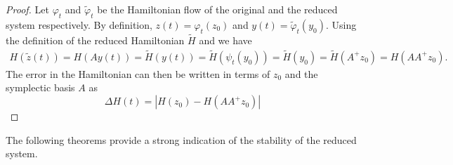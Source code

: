 \begin{proof}
	Let $\varphi_t$ and $\tilde \varphi_t$ be the Hamiltonian flow of the original and the reduced system respectively. By definition, $ z(t) = \varphi_t(z_0)$ and $ y(t) = \tilde \varphi_t(y_0)$. Using the definition of the reduced Hamiltonian $\tilde H$ and  we have
\begin{equation} \label{p1.eq:SyMo:6}
\begin{aligned}
	H(\tilde{{z}} (t)) = H( A y (t) ) = \tilde H( y (t)) = \tilde H(\psi_t( y_0)) = \tilde H( y_0) = \tilde H(A^+  z_0) = H(AA^+ z_0).
\end{aligned}
\end{equation}
The error in the Hamiltonian can then be written in terms of $z_0$ and the symplectic basis $A$ as
\begin{equation} \label{p1.eq:SyMo:7}
	\Delta H(t) = |H(z_0) - H(AA^+ z_0)|
\end{equation}
\end{proof}
The following theorems provide a strong indication of the stability of the reduced system.

